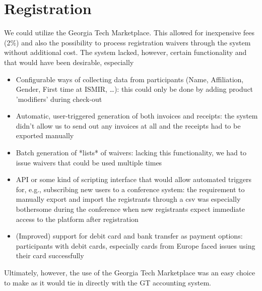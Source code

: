 \documentclass[%
10pt,								%
titlepage,						%
]
{scrartcl}
\begin{document}
        
\section{Registration}
    We could utilize the Georgia Tech Marketplace. This allowed for inexpensive fees (2\%) and also the possibility to process registration waivers through the system without additional cost. The system lacked, however, certain functionality and that would have been desirable, especially
    \begin{itemize}
        \item   Configurable ways of collecting data from participants (Name, Affiliation, Gender, First time at ISMIR, \ldots): this could only be done by adding product 'modifiers' during check-out
        \item   Automatic, user-triggered generation of both invoices and receipts: the system didn't allow us to send out any invoices at all and the receipts had to be exported manually 
        \item   Batch generation of *lists* of waivers: lacking this functionality, we had to issue waivers that could be used multiple times
        \item   API or some kind of scripting interface that would allow automated triggers for, e.g., subscribing new users to a conference system: the requirement to manually export and import the registrants through a csv was especially bothersome during the conference when new registrants expect immediate access to the platform after registration
        \item   (Improved) support for debit card and bank transfer as payment options: participants with debit cards, especially cards from Europe faced issues using their card successfully
    \end{itemize}
Ultimately, however, the use of the Georgia Tech Marketplace was an easy choice to make as it would tie in directly with the GT accounting system.
\end{document}
